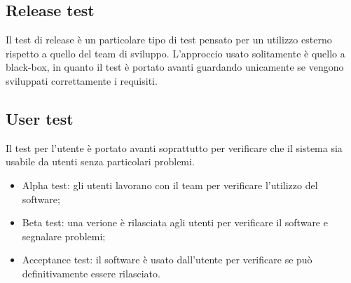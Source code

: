 \documentclass[a4paper, 10pt]{article}
\begin{document}
	\subsection{Release test}
	Il test di release è un particolare tipo di test pensato per un utilizzo esterno rispetto a quello del team di sviluppo. L'approccio usato solitamente è quello a black-box, in quanto il test è portato avanti guardando unicamente se vengono sviluppati correttamente i requisiti.
	
	\subsection{User test}
	Il test per l'utente è portato avanti soprattutto per verificare che il sistema sia usabile da utenti senza particolari problemi.
	\begin{itemize}
		\item Alpha test: gli utenti lavorano con il team per verificare l'utilizzo del software;
		\item Beta test: una verione è rilasciata agli utenti per verificare il software e segnalare problemi;
		\item Acceptance test: il software è usato dall'utente per verificare se può definitivamente essere rilasciato.
	\end{itemize}

	
	
	
	
	
\end{document}
